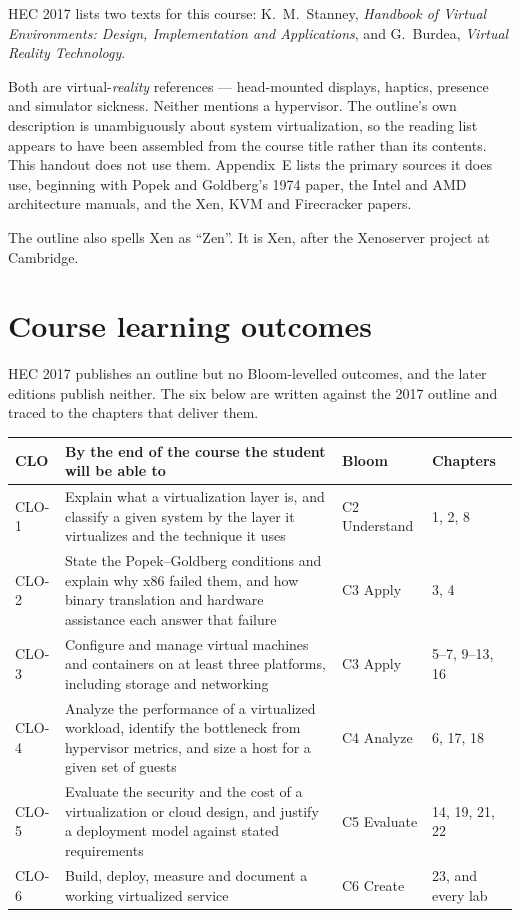 \begin{alertbox}
HEC 2017 lists two texts for this course: K.\ M.\ Stanney, \emph{Handbook of
Virtual Environments: Design, Implementation and Applications}, and G.\ Burdea,
\emph{Virtual Reality Technology}.

\smallskip
Both are virtual-\emph{reality} references --- head-mounted displays, haptics,
presence and simulator sickness. Neither mentions a hypervisor. The outline's own
description is unambiguously about system virtualization, so the reading list
appears to have been assembled from the course title rather than its contents.
This handout does not use them. Appendix~E lists the primary sources it does
use, beginning with Popek and Goldberg's 1974 paper, the Intel and AMD
architecture manuals, and the Xen, KVM and Firecracker papers.

\smallskip
The outline also spells Xen as ``Zen''. It is Xen, after the Xenoserver project
at Cambridge.
\end{alertbox}

\section*{Course learning outcomes}

HEC 2017 publishes an outline but no Bloom-levelled outcomes, and the later
editions publish neither. The six below are written against the 2017 outline and
traced to the chapters that deliver them.

\begin{longtable}{@{}L{1.3cm}L{7.6cm}L{2.1cm}L{3.8cm}@{}}
\toprule
{}
\textbf{CLO} & \textbf{By the end of the course the student will be able to} &
\textbf{Bloom} & \textbf{Chapters} \\
\midrule
\endhead
CLO-1 & Explain what a virtualization layer is, and classify a given system by
the layer it virtualizes and the technique it uses & C2 Understand & 1, 2, 8 \\
CLO-2 & State the Popek--Goldberg conditions and explain why x86 failed them,
and how binary translation and hardware assistance each answer that failure &
C3 Apply & 3, 4 \\
CLO-3 & Configure and manage virtual machines and containers on at least three
platforms, including storage and networking & C3 Apply & 5--7, 9--13, 16 \\
CLO-4 & Analyze the performance of a virtualized workload, identify the
bottleneck from hypervisor metrics, and size a host for a given set of guests &
C4 Analyze & 6, 17, 18 \\
CLO-5 & Evaluate the security and the cost of a virtualization or cloud design,
and justify a deployment model against stated requirements & C5 Evaluate &
14, 19, 21, 22 \\
CLO-6 & Build, deploy, measure and document a working virtualized service &
C6 Create & 23, and every lab \\
\bottomrule
\end{longtable}

